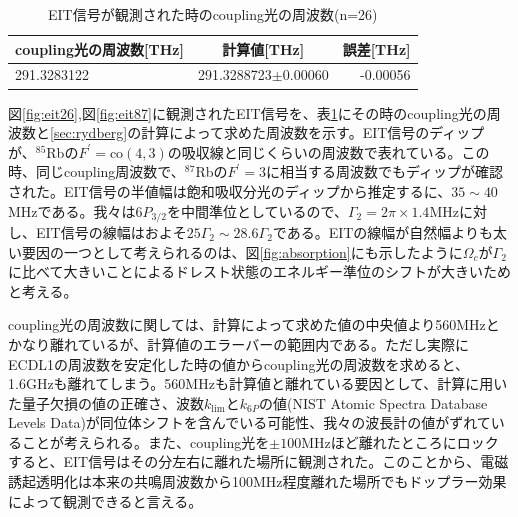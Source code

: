 \documentclass[dvipdfmx]{jsreport}
\begin{document}
\begin{table}[hbtp]
  \caption{EIT信号が観測された時のcoupling光の周波数(n=26)}
  \label{table:eit26}
  \centering
  \begin{tabular}{lcr}
    \hline
    coupling光の周波数[THz] & 計算値[THz] & 誤差[THz]  \\
    \hline
    291.3283122  & 291.3288723$\pm 0.00060$ & -0.00056  \\
    \hline
  \end{tabular}
\end{table}
図\ref{fig:eit26},図\ref{fig:eit87}に観測されたEIT信号を、表\ref{table:eit26}にその時のcoupling光の周波数と\ref{sec:rydberg}の計算によって求めた周波数を示す。EIT信号のディップが、$^{85}$Rbの$F^{'} = \text{co}(4,3)$の吸収線と同じくらいの周波数で表れている。この時、同じcoupling周波数で、$^{87}$Rbの$F^{'} = 3$に相当する周波数でもディップが確認された。EIT信号の半値幅は飽和吸収分光のディップから推定するに、$35 \sim 40$MHzである。我々は$6P_{3/2}$を中間準位としているので、$\Gamma_2 = 2\pi \times 1.4$MHzに対し、EIT信号の線幅はおよそ$25\Gamma_2 \sim 28.6\Gamma_2$である。EITの線幅が自然幅よりも太い要因の一つとして考えられるのは、図\ref{fig:absorption}にも示したように$\Omega_c$が$\Gamma_2$に比べて大きいことによるドレスト状態のエネルギー準位のシフトが大きいためと考える。

coupling光の周波数に関しては、計算によって求めた値の中央値より560MHzとかなり離れているが、計算値のエラーバーの範囲内である。ただし実際にECDL1の周波数を安定化した時の値からcoupling光の周波数を求めると、1.6GHzも離れてしまう。560MHzも計算値と離れている要因として、計算に用いた量子欠損の値の正確さ、波数$k_{\text{lim}}$と$k_{6P}$の値\cite{nist}(NIST Atomic Spectra Database Levels Data)が同位体シフトを含んでいる可能性、我々の波長計の値がずれていることが考えられる。また、coupling光を$\pm 100$MHzほど離れたところにロックすると、EIT信号はその分左右に離れた場所に観測された。このことから、電磁誘起透明化は本来の共鳴周波数から100MHz程度離れた場所でもドップラー効果によって観測できると言える。
\end{document}
